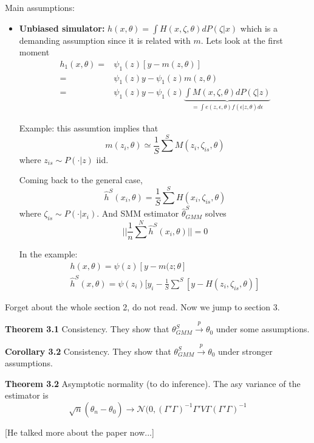 \documentclass[12pt]{article}
\begin{document}
Main assumptions:
\begin{itemize}
	\item \textbf{Unbiased simulator:} $h(x,\theta) = \int H(x, \zeta, \theta) dP(\zeta|x) $ which is a demanding assumption since it is related with $m$. Lets look at the first moment
	\begin{eqnarray*}
		h_1(x,\theta) = & \psi_1(z) [y - m(z, \theta)] \\
		= & \psi_1(z) y - \psi_1(z) m(z, \theta) \\
		= & \psi_1(z) y - \psi_1(z) \underbrace{ \int M(x, \zeta, \theta) dP(\zeta | z)}_{= \int e(z,\epsilon, \theta) f(\epsilon | z, \theta) d \epsilon} 
	\end{eqnarray*}

	Example: this assumtion implies that 
	\begin{equation*}
		m(z_i, \theta) \simeq \frac{1}{S} \sum^S M(z_i, \zeta_{is}, \theta) 
	\end{equation*}
	where $z_{is}\sim P(\cdot | z)$ iid.  
	
	Coming back to the general case, 
	\begin{equation*}
		\hat{h}^S(x_i, \theta) = \frac{1}{S} \sum^S H(x_i, \zeta_{is}, \theta)  
	\end{equation*}
	where $\zeta_{is} \sim P(\cdot|x_i)$. And SMM estimator $\hat{\theta}^S_{GMM}$ solves
	\begin{equation*}
		|| \frac{1}{n} \sum^N \hat{h}^S(x_i, \theta) || = 0
	\end{equation*}
	
	In the example:
	\begin{eqnarray*}
		h(x,\theta) = \psi(z) [y - m(z; \theta] \\
		\hat{h}^S(x,\theta) = \psi(z_i) [y_i - \frac{1}{S} \sum^S [y - H(z_i, \zeta_{is}, \theta)]
	\end{eqnarray*}
\end{itemize}

Forget about the whole section 2, do not read. Now we jump to section 3. 

\noindent \textbf{Theorem 3.1} Consistency. They show that $\theta^S_{GMM} \xrightarrow{p} \theta_0$ under some assumptions.

\noindent \textbf{Corollary 3.2} Consistency. They show that $\theta^S_{GMM} \xrightarrow{p} \theta_0$ under stronger assumptions.

\noindent \textbf{Theorem 3.2} Asymptotic normality (to do inference). The asy variance of the estimator is 
\begin{equation*}
	\sqrt{n} (\hat{\theta}_n - \theta_0) \rightarrow \mathcal{N}(0, (\Gamma' \Gamma)^{-1} \Gamma' V \Gamma  (\Gamma' \Gamma)^{-1}
\end{equation*}

[He talked more about the paper now...]
\end{document}
